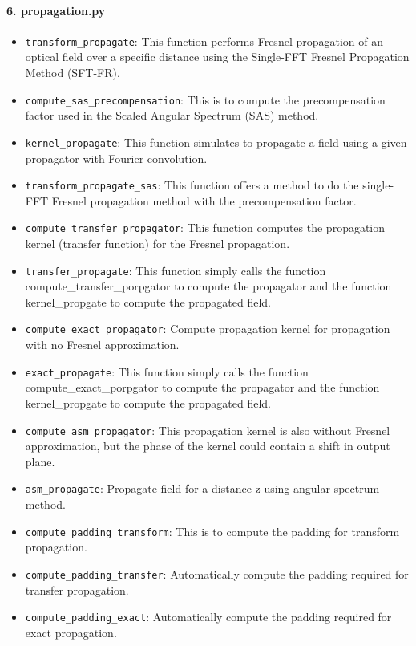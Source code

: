 \documentclass[a4paper,12pt]{report}
\begin{document}
\paragraph*{6. \textbf{propagation.py}}
\begin{itemize}
  \item \texttt{transform\_propagate}: This function performs Fresnel propagation of an optical field over a specific distance using the Single-FFT Fresnel Propagation Method (SFT-FR).
  \item \texttt{compute\_sas\_precompensation}: This is to compute the precompensation factor used in the Scaled Angular Spectrum (SAS) method.
  \item \texttt{kernel\_propagate}: This function simulates to propagate a field using a given propagator with Fourier convolution.
  \item \texttt{transform\_propagate\_sas}: This function offers a method to do the single-FFT Fresnel propagation method with the precompensation factor.
  \item \texttt{compute\_transfer\_propagator}: This function computes the propagation kernel (transfer function) for the Fresnel propagation.
  \item \texttt{transfer\_propagate}: This function simply calls the function compute\_transfer\_porpgator to compute the propagator and the function kernel\_propgate to compute the propagated field.
  \item \texttt{compute\_exact\_propagator}: Compute propagation kernel for propagation with no Fresnel approximation.
  \item \texttt{exact\_propagate}: This function simply calls the function compute\_exact\_porpgator to compute the propagator and the function kernel\_propgate to compute the propagated field.
  \item \texttt{compute\_asm\_propagator}: This propagation kernel is also without Fresnel approximation, but the phase of the kernel could contain a shift in output plane.
  \item \texttt{asm\_propagate}: Propagate field for a distance z using angular spectrum method.
  \item \texttt{compute\_padding\_transform}: This is to compute the padding for transform propagation.
  \item \texttt{compute\_padding\_transfer}: Automatically compute the padding required for transfer propagation.
  \item \texttt{compute\_padding\_exact}: Automatically compute the padding required for exact propagation.
\end{itemize}
\end{document}
